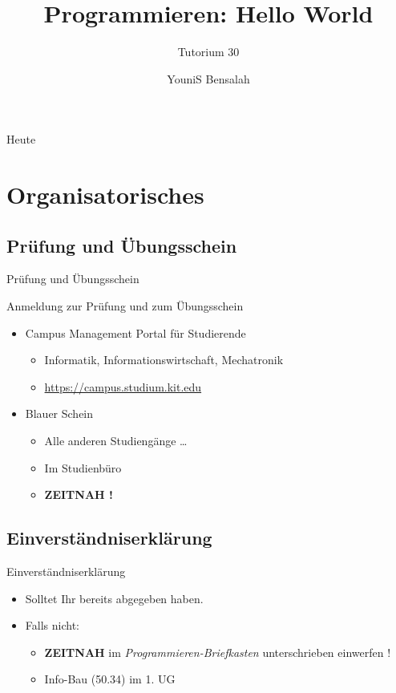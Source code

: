 \documentclass[18pt]{beamer}
\title[Hello World]{Programmieren: Hello World}
\subtitle{Tutorium 30}
\author{YouniS Bensalah}
\institute{Chair for Software Design and Quality}
\begin{document}

\begin{frame}
\titlepage
\end{frame}

\begin{frame}{Heute}
\tableofcontents
\end{frame}

\section{Organisatorisches}

\subsection{Prüfung und Übungsschein}
\begin{frame}{Prüfung und Übungsschein}
    \begin{block}{Anmeldung zur Prüfung und zum Übungsschein}
        \begin{itemize}
            \item Campus Management Portal für Studierende
            \begin{itemize}
                \item Informatik, Informationswirtschaft, Mechatronik
                \item \url{https://campus.studium.kit.edu}
            \end{itemize}
            \pause

            \item Blauer Schein
            \begin{itemize}
                \item Alle anderen Studiengänge \dots
                \item Im Studienbüro
                \pause
                \item \textbf{ZEITNAH !}
            \end{itemize}
        \end{itemize}
    \end{block}
\end{frame}

\subsection{Einverständniserklärung}
\begin{frame}{Einverständniserklärung}
    \begin{itemize}
        \item Solltet Ihr bereits abgegeben haben.
        \pause
        \item Falls nicht:
        \begin{itemize}
            \item \textbf{ZEITNAH} im \textit{Programmieren-Briefkasten} unterschrieben einwerfen !
            \item Info-Bau (50.34) im 1. UG
        \end{itemize}
    \end{itemize}
\end{frame}
\end{document}
